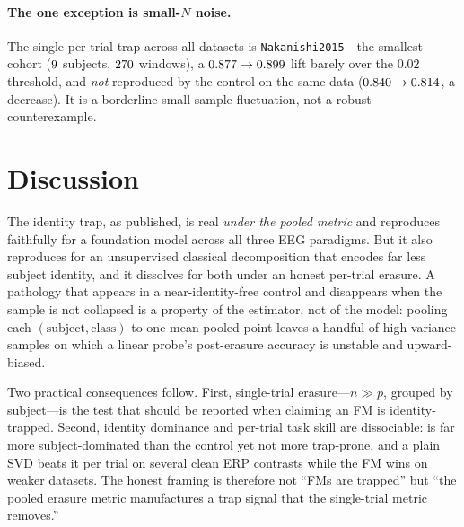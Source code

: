 \documentclass[11pt]{article}
\begin{document}
\begin{table}[t]\centering
\caption{Per-trial decode and identity encoding on representative ERP datasets. \reve{}'s subject
fraction is large, but the classical control decodes the task as well or better per trial with a
fraction of the identity. (\reve{} subject fraction and \tcm{} subject-probe BA are related but
distinct identity metrics; compare directions, not magnitudes.)}
\label{tab:h2h}
{\small\headToHeadTable}
\end{table}

\paragraph{The one exception is small-$N$ noise.} The single per-trial \reve{} trap across all
\fmPtNTotal{} datasets is \texttt{Nakanishi2015}---the smallest cohort ($9{}$ subjects,
$270{}$ windows), a $0.877{}\rightarrow0.899{}$ lift barely over the $0.02$ threshold, and
\emph{not} reproduced by the \tcm{} control on the same data
($0.840{}\rightarrow0.814{}$, a decrease). It is a borderline small-sample fluctuation,
not a robust counterexample.

\section{Discussion}
The identity trap, as published, is real \emph{under the pooled metric} and reproduces faithfully for
a foundation model across all three EEG paradigms. But it also reproduces for an unsupervised
classical decomposition that encodes far less subject identity, and it dissolves for both under an
honest per-trial erasure. A pathology that appears in a near-identity-free control and disappears when
the sample is not collapsed is a property of the estimator, not of the model: pooling each
$(\text{subject},\text{class})$ to one mean-pooled point leaves a handful of high-variance samples on
which a linear probe's post-erasure accuracy is unstable and upward-biased.

Two practical consequences follow. First, single-trial erasure---$n\gg p$, grouped by subject---is the
test that should be reported when claiming an FM is identity-trapped. Second, identity dominance and
per-trial task skill are dissociable: \reve{} is far more subject-dominated than the control yet not
more trap-prone, and a plain SVD beats it per trial on several clean ERP contrasts while the FM wins on
weaker datasets. The honest framing is therefore not ``FMs are trapped'' but ``the pooled erasure
metric manufactures a trap signal that the single-trial metric removes.''
\end{document}
